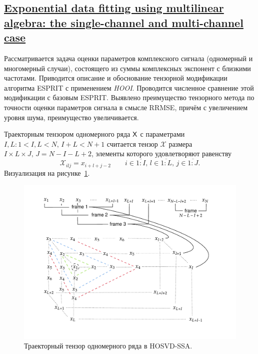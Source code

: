 \documentclass[12pt]{article}
\theoremstyle{plain}
\theoremstyle{definition}
\theoremstyle{remark}
\newcommand{\HOOI}{\emph{HOOI}}
\begin{document}
\subsection{\href{https://doi.org/10.1002/nla.453}{Exponential data
    fitting using multilinear algebra: the single-channel and
multi-channel case}}\label{Papy2005}
Рассматривается задача оценки параметров комплексного сигнала
(одномерный и многомерный случаи), состоящего из
суммы комплексных экспонент с близкими частотами.
Приводится описание и обоснование тензорной модификации алгоритма
ESPRIT с применением \HOOI{}.
Проводится численное сравнение этой модификации с базовым ESPRIT.
Выявлено преимущество тензорного метода по точности оценки параметров
сигнала в смысле RRMSE, причём с увеличением уровня шума,
преимущество увеличивается.

Траекторным тензором одномерного ряда $\mathsf{X}$ с параметрами $I,L: 1 < I,L < N,\,
I + L < N + 1$ считается тензор $\mathcal{X}$ размера $I\times L \times J,\,
J=N-I-L+2$, элементы которого удовлетворяют равенству
\[
  \mathcal{X}_{ilj}=x_{i+l+j-2}\qquad i\in \overline{1:I},\, l
  \in\overline{1:L},\, j \in\overline{1:J}.
\]
Визуализация на рисунке~\ref{fig:traj-hosvd-ssa}.
\begin{figure}[!ht]
  \centering
  \includegraphics[width=\textwidth]{tens-injection-wide.pdf}
  \caption{Траекторный тензор одномерного ряда в
  HOSVD-SSA.}\label{fig:traj-hosvd-ssa}
\end{figure}
\end{document}
